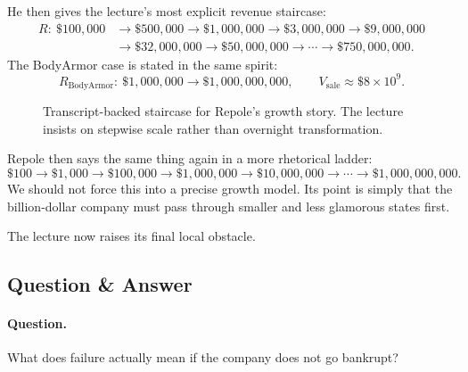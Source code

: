 He then gives the lecture's most explicit revenue staircase:
\begin{align}
R:\ 
\$100{,}000
&\to \$500{,}000
\to \$1{,}000{,}000
\to \$3{,}000{,}000
\to \$9{,}000{,}000 \nonumber\\
&\to \$32{,}000{,}000
\to \$50{,}000{,}000
\to \cdots
\to \$750{,}000{,}000.
\end{align}
The BodyArmor case is stated in the same spirit:
\begin{equation}
R_{\mathrm{BodyArmor}}:\ \$1{,}000{,}000 \to \$1{,}000{,}000{,}000,
\qquad
V_{\mathrm{sale}} \approx \$8\times 10^9.
\end{equation}

\begin{figure}[h]
\centering
{}
\caption{Transcript-backed staircase for Repole's growth story. The lecture insists on stepwise scale rather than overnight transformation.}
\end{figure}

Repole then says the same thing again in a more rhetorical ladder:
\begin{equation}
\$100 \to \$1{,}000 \to \$100{,}000 \to \$1{,}000{,}000 \to \$10{,}000{,}000 \to \cdots \to \$1{,}000{,}000{,}000.
\end{equation}
We should not force this into a precise growth model. Its point is simply that the billion-dollar company must pass through smaller and less glamorous states first.

The lecture now raises its final local obstacle.

\subsection{Question \& Answer}

\paragraph{Question.}
What does failure actually mean if the company does not go bankrupt?

